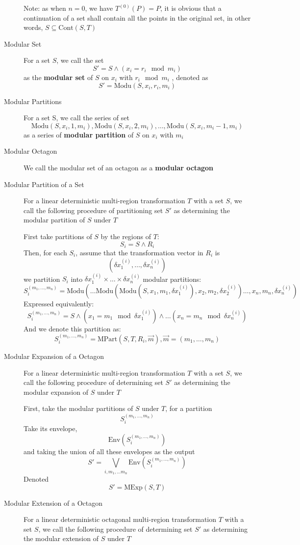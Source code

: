 \documentclass[letterpaper,]{article}
\begin{document}
\begin{description}
Note: as when \(n = 0\), we have \(T^{(0)}(P) = P\), it is obvious that
a continuation of a set shall contain all the points in the original
set, in other words, \(S \subseteq \mathrm{Cont}(S, T)\)
\item[Modular Set]
For a set \(S\), we call the set \[S' = S \land (x_i = r_i \mod m_i)\]
as the \textbf{modular set} of \(S\) on \(x_i\) with \(r_i \mod m_i\) ,
denoted as \[S' = \mathrm{Modu}(S, x_i, r_i, m_i)\]
\item[Modular Partitions]
For a set S, we call the series of set
\[\mathrm{Modu}(S, x_i, 1, m_i), \mathrm{Modu}(S, x_i, 2, m_i), \dots, \mathrm{Modu}(S, x_i, m_i - 1, m_i)\]
as a series of \textbf{modular partition} of \(S\) on \(x_i\) with
\(m_i\)
\item[Modular Octagon]
We call the modular set of an octagon as a \textbf{modular octagon}
\item[Modular Partition of a Set]
For a linear deterministic multi-region transformation \(T\) with a set
\(S\), we call the following procedure of partitioning set \(S'\) as
determining the modular partition of \(S\) under \(T\)

First take partitions of \(S\) by the regions of \(T\):
\[ S_i = S \land R_i \] Then, for each \(S_i\), assume that the
transformation vector in \(R_i\) is
\[(\delta x_1^{(i)}, \dots, \delta x_n^{(i)}) \] we partition \(S_i\)
into \(\delta x_1^{(i)} \times \dots \times \delta x_n^{(i)}\) modular
partitions:
\[S_i^{(m_1, \dots, m_n)} = \mathrm{Modu}(\dots \mathrm{Modu}(\mathrm{Modu}( S, x_1, m_1, \delta x_1^{(i)}), x_2, m_2, \delta x_2^{(i)} ) \dots , x_n, m_n, \delta x_n^{(i)} ) \]
Expressed equivalently:
\[S_i^{(m_1, \dots, m_n)} = S \land (x_1 = m_1 \mod \delta x_1^{(i)}) \land \dots (x_n = m_n \mod \delta x_n^{(i)}) \]
And we denote this partition as:
\[S_i^{(m_1, \dots, m_n)} = \mathrm{MPart}(S, T, R_i, \vec{m}), \vec{m} = (m_1, \dots, m_n)\]
\item[Modular Expansion of a Octagon]
For a linear deterministic multi-region transformation \(T\) with a set
\(S\), we call the following procedure of determining set \(S'\) as
determining the modular expansion of \(S\) under \(T\)

First, take the modular partitions of \(S\) under \(T\), for a partition
\[S_i^{(m_1, \dots, m_n)} \] Take its envelope,
\[\mathrm{Env}(S_i^{(m_1, \dots, m_n)}) \] and taking the union of all
these envelopes as the output
\[S' = \bigvee_{i, m_1, \dots m_n} \mathrm{Env}(S_i^{(m_1, \dots, m_n)}) \]
Denoted \[S' = \mathrm{MExp}(S, T)\]
\item[Modular Extension of a Octagon]
For a linear deterministic octagonal multi-region transformation \(T\)
with a set \(S\), we call the following procedure of determining set
\(S'\) as determining the modular extension of \(S\) under \(T\)


\end{description}
\end{document}
